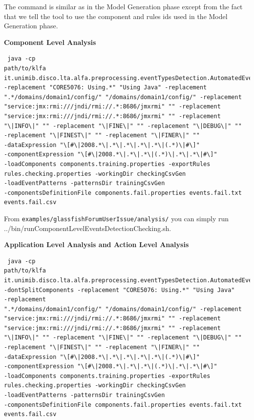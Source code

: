 The command is similar as in the Model Generation phase except from
the fact that we tell the tool to use the component and rules ids
used in the Model Generation phase. 

\textbf{Component Level Analysis}
\begin{verbatim}
 java -cp
path/to/klfa
it.unimib.disco.lta.alfa.preprocessing.eventTypesDetection.AutomatedEventTypesDetector
-replacement "CORE5076: Using.*" "Using Java" -replacement
".*/domains/domain1/config/" "/domains/domain1/config/" -replacement
"service:jmx:rmi:///jndi/rmi://.*:8686/jmxrmi" "" -replacement
"service:jmx:rmi:///jndi/rmi://.*:8686/jmxrmi" "" -replacement
"\|INFO\|" "" -replacement "\|FINE\|" "" -replacement "\|DEBUG\|" ""
-replacement "\|FINEST\|" "" -replacement "\|FINER\|" ""
-dataExpression "\[#\|2008.*\|.*\|.*\|.*\|.*\|(.*)\|#\]"
-componentExpression "\[#\|2008.*\|.*\|.*\|(.*)\|.*\|.*\|#\]" 
-loadComponents components.training.properties -exportRules
rules.checking.properties -workingDir checkingCsvGen
-loadEventPatterns -patternsDir trainingCsvGen
-componentsDefinitionFile components.fail.properties events.fail.txt
events.fail.csv

\end{verbatim}

From \texttt{examples/glassfishForumUserIssue/analysis/} you can simply run
../bin/runComponentLevelEventsDetectionChecking.sh.

\textbf{Application Level Analysis and Action Level Analysis}

\begin{verbatim}
 java -cp
path/to/klfa
it.unimib.disco.lta.alfa.preprocessing.eventTypesDetection.AutomatedEventTypesDetector
-dontSplitComponents -replacement "CORE5076: Using.*" "Using Java"
-replacement
".*/domains/domain1/config/" "/domains/domain1/config/" -replacement
"service:jmx:rmi:///jndi/rmi://.*:8686/jmxrmi" "" -replacement
"service:jmx:rmi:///jndi/rmi://.*:8686/jmxrmi" "" -replacement
"\|INFO\|" "" -replacement "\|FINE\|" "" -replacement "\|DEBUG\|" ""
-replacement "\|FINEST\|" "" -replacement "\|FINER\|" ""
-dataExpression "\[#\|2008.*\|.*\|.*\|.*\|.*\|(.*)\|#\]"
-componentExpression "\[#\|2008.*\|.*\|.*\|(.*)\|.*\|.*\|#\]" 
-loadComponents components.training.properties -exportRules
rules.checking.properties -workingDir checkingCsvGen
-loadEventPatterns -patternsDir trainingCsvGen
-componentsDefinitionFile components.fail.properties events.fail.txt
events.fail.csv

\end{verbatim}

